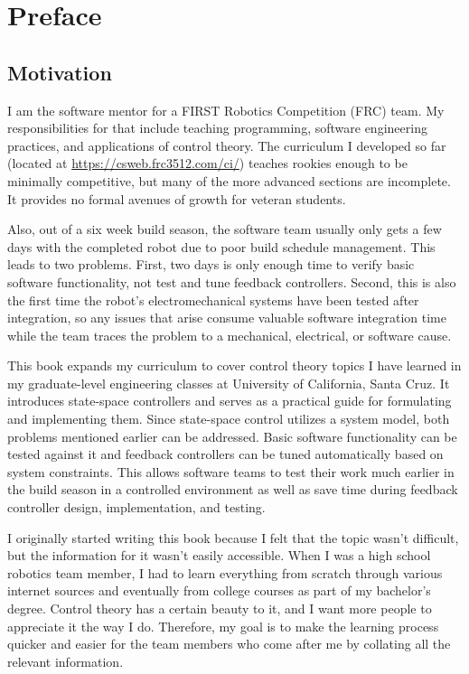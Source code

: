 
\chapter*{Preface}

\section*{Motivation}

I am the software mentor for a FIRST Robotics Competition (FRC) team. My
responsibilities for that include teaching programming, software engineering
practices, and applications of control theory. The curriculum I developed so far
(located at \url{https://csweb.frc3512.com/ci/}) teaches rookies enough to be
minimally competitive, but many of the more advanced sections are incomplete. It
provides no formal avenues of growth for veteran students.

Also, out of a six week build season, the software team usually only gets a few
days with the completed robot due to poor build schedule management. This leads
to two problems. First, two days is only enough time to verify basic software
functionality, not test and tune feedback controllers. Second, this is also the
first time the robot's electromechanical systems have been tested after
integration, so any issues that arise consume valuable software integration time
while the team traces the problem to a mechanical, electrical, or software
cause.

This book expands my curriculum to cover control theory topics I have learned in
my graduate-level engineering classes at University of California, Santa Cruz.
It introduces state-space controllers and serves as a practical guide for
formulating and implementing them. Since state-space control utilizes a system
model, both problems mentioned earlier can be addressed. Basic software
functionality can be tested against it and feedback controllers can be tuned
automatically based on system constraints. This allows software teams to test
their work much earlier in the build season in a controlled environment as well
as save time during feedback controller design, implementation, and testing.

I originally started writing this book because I felt that the topic wasn't
difficult, but the information for it wasn't easily accessible. When I was a
high school robotics team member, I had to learn everything from scratch through
various internet sources and eventually from college courses as part of my
bachelor's degree. Control theory has a certain beauty to it, and I want more
people to appreciate it the way I do. Therefore, my goal is to make the learning
process quicker and easier for the team members who come after me by collating
all the relevant information.

